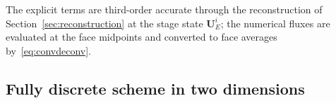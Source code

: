 \documentclass[a4paper,fleqn]{cas-sc}
\theoremstyle{remark}
\begin{document}
The explicit terms are third-order accurate through the reconstruction of
Section~\ref{sec:reconstruction} at the stage state $\mathbf{U}_E^{i}$; the
numerical fluxes are evaluated at the face midpoints and converted to face
averages by~\eqref{eq:convdeconv}.
 


 
\subsection{Fully discrete scheme in two dimensions}
\label{sec:fully_discrete}
\end{document}
